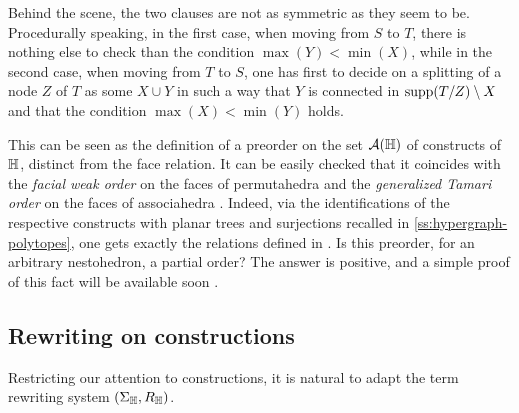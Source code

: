 Behind the scene, the two clauses are not as symmetric as they seem to be. 
Procedurally speaking, in the first case, when moving from $S$ to $T$, there is nothing else to check than the condition $ \max(Y)<\min(X)$, while in the second case, when moving from $T$ to $S$, one has first to decide on a splitting of a node $Z$ of $T$ as some $X\cup Y$ in such a way that $Y$ is connected in $\mathrm{supp}(T/Z)\setminus X$ and that the condition $\max(X)<\min(Y)$ holds.

\begin{remark}
  \label{rem:facialweak}
  This can be seen as the definition of a preorder on the set $\mathcal{A}({\mathbb H})$ of constructs of ${\mathbb H}$, distinct from the face relation. 
  It can be easily checked that it coincides with the \emph{facial weak order} on the faces of permutahedra \cite{KrobLatapyNovelliPhanSchwer,PalaciosRonco,DermenjianHohlwegPilaud} and the \emph{generalized Tamari order}  on the faces of associahedra \cite{Ronco-Tamari}. 
  Indeed, via the identifications of the respective constructs with planar trees and surjections recalled in \cref{ss:hypergraph-polytopes}, one gets exactly the relations defined in \cite[Definition 30 and Lemma 17]{PalaciosRonco}.
  Is this preorder, for an arbitrary nestohedron, a partial order? 
  The answer is positive, and a simple proof of this fact will be available soon \cite{RSON}.
\end{remark}


\subsection{Rewriting on constructions}
\label{ss:rewriting-constructions}

Restricting our attention to constructions, it is natural to adapt the term rewriting system  $(\Sigma_{\mathbb H},R_{\mathbb H})$.

